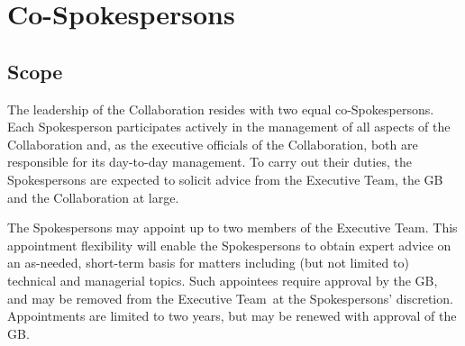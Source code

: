 \documentclass[12pt]{article}
\newcommand{\exec}{{Executive Team}}
\begin{document}


\section{Co-Spokespersons}
\label{sec:spokes}



\subsection{Scope}

The	%
leadership of the Collaboration resides with two equal co-Spokespersons.			
Each Spokesperson participates actively in the management of all aspects of the Collaboration and, as the executive officials of the Collaboration, both  are responsible for its day-to-day management. 
To carry out their duties, the Spokespersons are expected to solicit advice from the \exec, the GB and the Collaboration at large.  %

The Spokespersons may appoint up to two members of the \exec. This appointment flexibility will enable the Spokespersons to obtain expert advice on an as-needed, short-term basis for matters including (but not limited to) technical and managerial topics.
Such appointees require approval by the GB, 
and may be removed from the \exec\ at the Spokespersons' discretion.  Appointments are limited to two years, but may be renewed with approval of the GB. 
\end{document}
